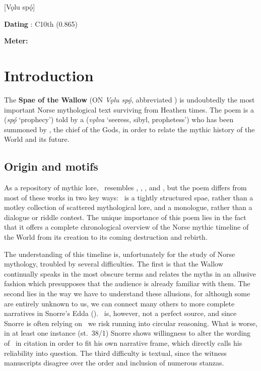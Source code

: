 [Vǫlu spǫ́]

\begin{flushright}%
\textbf{Dating} \parencite{Sapp2022}: C10th (0.865)

\textbf{Meter:} \Fornyrdislag%
\end{flushright}

\section{Introduction}

The \textbf{Spae of the Wallow} (ON \emph{Vǫlu spǫ́}, abbreviated \Voluspa) is undoubtedly the most important Norse mythological text surviving from Heathen times.  The poem is a  (\emph{spǫ́} ‘prophecy’) told by a  (\emph{vǫlva} ‘seeress, sibyl, prophetess’) who has been summoned by , the chief of the Gods, in order to relate the mythic history of the World and its future.

\subsection{Origin and motifs}

As a repository of mythic lore, \Voluspa\ resembles , , , and , but the poem differs from most of these works in two key ways: \Voluspa\ is a tightly structured spae, rather than a motley collection of scattered mythological lore, and a monologue, rather than a dialogue or riddle contest.  The unique importance of this poem lies in the fact that it offers a complete chronological overview of the Norse mythic timeline of the World from its creation to its coming destruction and rebirth.

The understanding of this timeline is, unfortunately for the study of Norse mythology, troubled by several difficulties.  The first is that the Wallow continually speaks in the most obscure terms and relates the myths in an allusive fashion which presupposes that the audience is already familiar with them.  The second lies in the way we have to understand these allusions, for although some are entirely unknown to us, we can connect many others to more complete narratives in Snorre’s Edda (\SnorraEdda).  \SnorraEdda\ is, however, not a perfect source, and since Snorre is often relying on \Voluspa\ we risk running into circular reasoning.  What is worse, in at least one instance (st.~38/1) Snorre shows willingness to alter the wording of \Voluspa\ in citation in order to fit his own narrative frame, which directly calls his reliability into question.  The third difficulty is textual, since the witness manuscripts disagree over the order and inclusion of numerous stanzas.

